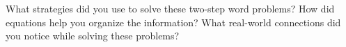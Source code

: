 \documentclass[12pt]{article}
\begin{document}
\begin{tcolorbox}[colframe=black!60, colback=white, 
coltitle=black, colbacktitle=black!15, fonttitle=\bfseries\Large, 
title=Reflection, halign title=center, left=10pt, right=10pt, top=10pt, bottom=80pt]
What strategies did you use to solve these two-step word problems? How did equations help you organize the information? What real-world connections did you notice while solving these problems?
\end{tcolorbox}
\end{document}
